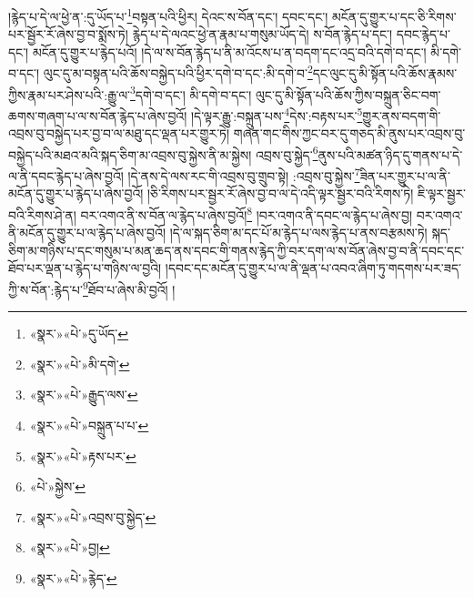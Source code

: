 །རྙེད་པ་དེ་ལ་ཕྱེ་ན་:དུ་ཡོད་པ་\footnote{«སྣར་»«པེ་»དུ་ཡོད་}བསྟན་པའི་ཕྱིར། དེའང་ས་བོན་དང་། དབང་དང་། མངོན་དུ་གྱུར་པ་དང་ཅི་རིགས་པར་སྦྱོར་རོ་ཞེས་བྱ་བ་སྨོས་ཏེ། རྙེད་པ་དེ་ལའང་ཕྱེ་ན་རྣམ་པ་གསུམ་ཡོད་དེ། ས་བོན་རྙེད་པ་དང་། དབང་རྙེད་པ་དང་། མངོན་དུ་གྱུར་པ་རྙེད་པའོ། །དེ་ལ་ས་བོན་རྙེད་པ་ནི་མ་འོངས་པ་ན་བདག་དང་འདྲ་བའི་དགེ་བ་དང་། མི་དགེ་བ་དང་། ལུང་དུ་མ་བསྟན་པའི་ཆོས་བསྐྱེད་པའི་ཕྱིར་དགེ་བ་དང་:མི་དགེ་བ་\footnote{«སྣར་»«པེ་»མི་དགེ་}དང་ལུང་དུ་མི་སྟོན་པའི་ཆོས་རྣམས་ཀྱིས་རྣམ་པར་ཤེས་པའི་:རྒྱུ་ལ་\footnote{«སྣར་»«པེ་»རྒྱུད་ལས་}དགེ་བ་དང་། མི་དགེ་བ་དང་། ལུང་དུ་མི་སྟོན་པའི་ཆོས་ཀྱིས་བསྐྲུན་ཅིང་བག་ཆགས་གཞག་པ་ལ་ས་བོན་རྙེད་པ་ཞེས་བྱའོ། །དེ་ལྟར་རྒྱུ་:བསྐྲུན་པས་\footnote{«སྣར་»«པེ་»བསྐྲུན་པ་པ་}དེས་:བརྟས་པར་\footnote{«སྣར་»«པེ་»རྟས་པར་}གྱུར་ནས་བདག་གི་འབྲས་བུ་བསྐྱེད་པར་བྱ་བ་ལ་མཐུ་དང་ལྡན་པར་གྱུར་ཏེ། གཞན་གང་གིས་ཀྱང་བར་དུ་གཅད་མི་ནུས་པར་འབྲས་བུ་བསྐྱེད་པའི་མཐའ་མའི་སྐད་ཅིག་མ་འབྲས་བུ་སྐྱེས་ནི་མ་སྐྱེས། འབྲས་བུ་སྐྱེད་\footnote{«པེ་»སྐྱེས་}ནུས་པའི་མཚན་ཉིད་དུ་གནས་པ་དེ་ལ་ནི་དབང་རྙེད་པ་ཞེས་བྱའོ། །དེ་ནས་དེ་ལས་རང་གི་འབྲས་བུ་གྲུབ་སྟེ། :འབྲས་བུ་སྐྱེས་\footnote{«སྣར་»«པེ་»འབྲས་བུ་སྐྱེད་}ཟིན་པར་གྱུར་པ་ལ་ནི་མངོན་དུ་གྱུར་པ་རྙེད་པ་ཞེས་བྱའོ། །ཅི་རིགས་པར་སྦྱར་རོ་ཞེས་བྱ་བ་ལ་དེ་འདི་ལྟར་སྦྱར་བའི་རིགས་ཏེ། ཇི་ལྟར་སྦྱར་བའི་རིགས་ཤེ་ན། བར་འགའ་ནི་ས་བོན་ལ་རྙེད་པ་ཞེས་བྱའོ།\footnote{«སྣར་»«པེ་»བྱ།} །བར་འགའ་ནི་དབང་ལ་རྙེད་པ་ཞེས་བྱ། བར་འགའ་ནི་མངོན་དུ་གྱུར་པ་ལ་རྙེད་པ་ཞེས་བྱའོ། །དེ་ལ་སྐད་ཅིག་མ་དང་པོ་མ་རྙེད་པ་ལས་རྙེད་པ་ནས་བརྩམས་ཏེ། སྐད་ཅིག་མ་གཉིས་པ་དང་གསུམ་པ་མན་ཆད་ནས་དབང་གི་གནས་རྙེད་ཀྱི་བར་དག་ལ་ས་བོན་ཞེས་བྱ་བ་ནི་དབང་དང་ཐོབ་པར་ལྡན་པ་རྙེད་པ་གཉིས་ལ་བྱའི། །དབང་དང་མངོན་དུ་གྱུར་པ་ལ་ནི་ལྡན་པ་འབའ་ཞིག་ཏུ་གདགས་པར་ཟད་ཀྱི་ས་བོན་:རྙེད་པ་\footnote{«སྣར་»«པེ་»རྙེད་}ཐོབ་པ་ཞེས་མི་བྱའོ། །
